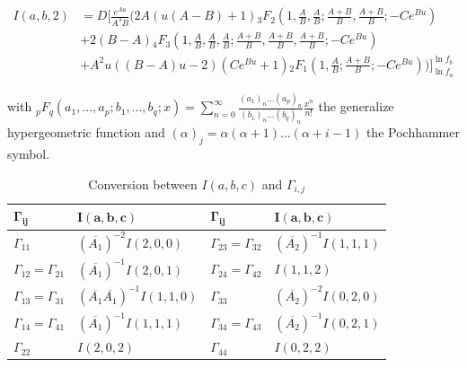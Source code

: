\documentclass[a4paper,12pt]{article}
\newcommand{\fact}[1]{#1\mathpunct{}!}
\begin{document}
        \begin{equation}
            \begin{split}
                I(a,b,2)&= D \Bigg [ \frac{e^{Au}}{A^3 B} \Bigg(2 A(u(A-B)+1) {}_3F_2 \left( 1, \frac{A}{B}, \frac{A}{B}; \frac{A+B}{B}, \frac{A+B}{B}; -C e^{Bu} \right)\\[.5em]
                &+2(B-A) {}_4F_3 \left( 1, \frac{A}{B}, \frac{A}{B}, \frac{A}{B}; \frac{A+B}{B},\frac{A+B}{B}, \frac{A+B}{B}; -C e^{Bu} \right)\\[.5em]
                &+ A^2u ((B-A)u -2)(Ce^{Bu}+1){}_2F_1 \left(1, \frac{A}{B}; \frac{A+B}{B}; -Ce^{Bu} \right)\Bigg) \Bigg]_{\ln f_a}^{\ln f_b}   
            \end{split}
        \end{equation}

 with ${}_pF_q\left(a_1, ..., a_p; b_1,... , b_q;x\right) = \sum_{n=0}^\infty \frac{(a_1)_n ... (a_p)_n}{(b_1)_n ... (b_q)_n}\frac{x^n}{\fact{n}}$ the generalize hypergeometric function and $(\alpha)_j = \alpha(\alpha+1)...(\alpha+i-1)$ the  Pochhammer symbol. 



\begin{table}[H]
\begin{center}
\begin{tabular}{|l|l|l|l|}
\hline
$\mathbf{\Gamma_{ij}}$    & $\mathbf{I(a,b,c)}$                                      & $\mathbf{\Gamma_{ij}}$    & $\mathbf{I(a,b,c)}$                        \\ \hline
$\Gamma_{11}$             & $\left(\overline{A_1}\right)^{-2}I(2,0,0)$               & $\Gamma_{23}=\Gamma_{32}$ & $\left(\overline{A_2}\right)^{-1}I(1,1,1)$ \\ \hline
$\Gamma_{12}=\Gamma_{21}$ & $\left(\overline{A_1}\right)^{-1}I(2,0,1)$               & $\Gamma_{24}=\Gamma_{42}$ & $I(1,1,2)$                                 \\ \hline
$\Gamma_{13}=\Gamma_{31}$ & $\left(\overline{A_1}\overline{A_1}\right)^{-1}I(1,1,0)$ & $\Gamma_{33}$             & $\left(\overline{A_2}\right)^{-2}I(0,2,0)$ \\ \hline
$\Gamma_{14}=\Gamma_{41}$ & $\left(\overline{A_1}\right)^{-1}I(1,1,1)$               & $\Gamma_{34}=\Gamma_{43}$ & $\left(\overline{A_2}\right)^{-1}I(0,2,1)$ \\ \hline
$\Gamma_{22}$             & $I(2,0,2)$                                               & $\Gamma_{44}$             & $I(0,2,2)$                                 \\ \hline
\end{tabular}
\end{center}
\caption{Conversion between $I(a,b,c)$ and $\Gamma_{i,j}$}
\label{Table:Inte}
\end{table}
\end{document}
